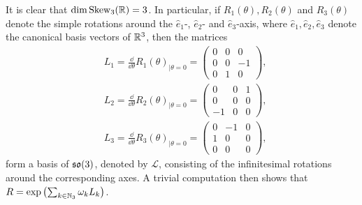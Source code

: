 It is clear that $\dim \operatorname{Skew}_3(\mathbb{R}) = 3$. In particular, if $R_1(\theta), R_2(\theta)$ and $R_3(\theta)$ denote the simple rotations around the $\hat{e}_1$-, $\hat{e}_2$- and $\hat{e}_3$-axis, where $\hat{e}_1, \hat{e}_2, \hat{e}_3$ denote the canonical basis vectors of $\mathbb{R}^3$, then the matrices
\begin{align}
\label{eq: L1}
	&L_1 = \frac{\dd}{\dd\theta}R_1(\theta)_{\mid \theta =0} = \left(\begin{array}{ccc}
	0 & 0 & 0 \\ 
	0 & 0 & -1 \\ 
	0 & 1 & 0
	\end{array}  \right ),\\
\label{eq: L2}
	&L_2 = \frac{\dd}{\dd\theta}R_2(\theta)_{\mid \theta =0} = \left (\begin{array}{ccc}
	0 & 0 & 1 \\ 
	0 & 0 & 0 \\ 
	-1 & 0 & 0
	\end{array}  \right ),\\
\label{eq: L3}
	&L_3 = \frac{\dd}{\dd\theta}R_3(\theta)_{\mid \theta =0} = \left (\begin{array}{ccc}
	0 & -1 & 0 \\ 
	1 & 0 & 0 \\ 
	0 & 0 & 0
	\end{array}  \right ),
\end{align}
form a basis of $\mathfrak{so}(3)$, denoted by $\mathcal{L}$, consisting of the infinitesimal rotations around the corresponding axes. A trivial computation then shows that $R = \exp\left ( \sum_{k \in \mathbb{N}_3} \omega_k L_k \right )$. 

